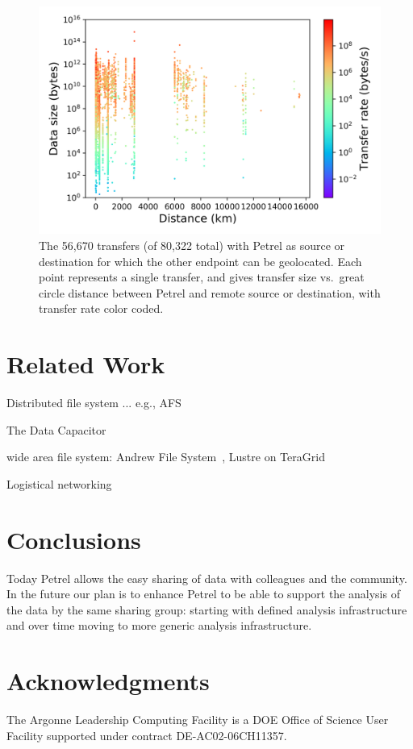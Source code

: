 \documentclass[sigconf]{acmart}
\begin{document}
\begin{figure}
\centering
\includegraphics[trim=0.1in 0.1in 0.1in 0.1in,clip,width=\columnwidth]{Figures/size-distance-speed.png}

\vspace{-2ex}

\caption{The 56,670 transfers (of 80,322 total) with Petrel as source or destination
for which the other endpoint can be geolocated. Each
point represents a single transfer,
and gives transfer size vs.\ great circle distance between Petrel and remote source or destination, 
with transfer rate color coded.\label{fig:usage2}}
\end{figure}



\section{Related Work}

Distributed file system ... e.g., AFS 

The Data Capacitor~\cite{simms2007empowering}

wide area file system: Andrew File System~\cite{howard1988scale}, Lustre on TeraGrid~\cite{simms2007wide}

Logistical networking~\cite{beck2000logistical} 




\section{Conclusions}


Today Petrel allows the easy sharing of data with colleagues and the community.
In the future our plan is to enhance Petrel to be able to support the analysis of the data by the same sharing group:
starting with defined analysis infrastructure and over time moving to more generic analysis infrastructure.

\section*{Acknowledgments}
The Argonne Leadership Computing Facility is a DOE Office of Science User Facility supported under contract DE-AC02-06CH11357.



 
\end{document}
